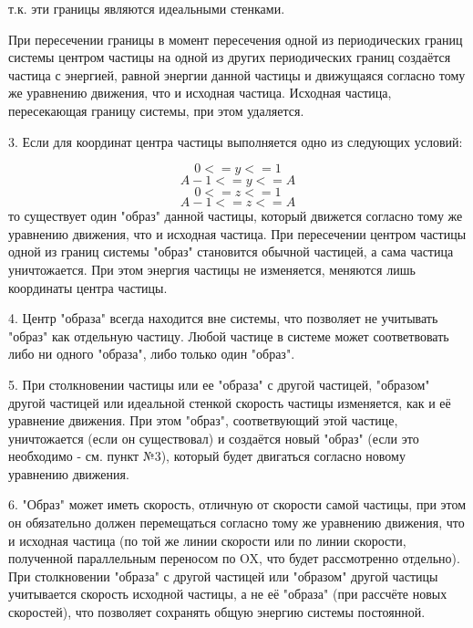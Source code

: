\documentclass{article}
\begin{document}
т.к. эти границы являются идеальными стенками. 

При пересечении границы в момент пересечения одной из периодических границ системы центром частицы на одной из других периодических границ создаётся частица с энергией, равной энергии данной частицы и движущаяся согласно тому же уравнению движения, что и исходная частица. Исходная частица, пересекающая границу системы, при этом удаляется.

3. Если для координат центра частицы выполняется одно из следующих условий:

\begin{equation}
0 <= y <= 1
\end{equation}
\begin{equation}
A - 1 <= y <= A
\end{equation}
\begin{equation}
0 <= z <= 1
\end{equation}
\begin{equation}
A - 1 <= z <= A
\end{equation}
то существует один "образ" данной частицы, который движется согласно тому же уравнению движения, что и исходная частица. При пересечении центром частицы одной из границ системы "образ" становится обычной частицей, а сама частица уничтожается. При этом энергия частицы не изменяется, меняются лишь координаты центра частицы.

4. Центр "образа" всегда находится вне системы, что позволяет не учитывать "образ" как отдельную частицу. Любой частице в системе может соответвовать либо ни одного "образа", либо только один "образ".

5. При столкновении частицы или ее "образа" с другой частицей, "образом" другой частицей или идеальной стенкой скорость частицы изменяется, как и её уравнение движения. При этом "образ", соответвующий этой частице, уничтожается (если он существовал) и создаётся новый "образ" (если это необходимо - см. пункт №3), который будет двигаться согласно новому уравнению движения.

6. "Образ" может иметь скорость, отличную от скорости самой частицы, при этом он обязательно должен перемещаться согласно тому же уравнению движения, что и исходная частица (по той же линии скорости или по линии скорости, полученной параллельным переносом по OX, что будет рассмотренно отдельно). При столкновении "образа" с другой частицей или "образом" другой частицы учитывается скорость исходной частицы, а не её "образа" (при рассчёте новых скоростей), что позволяет сохранять общую энергию системы постоянной.
\end{document}
